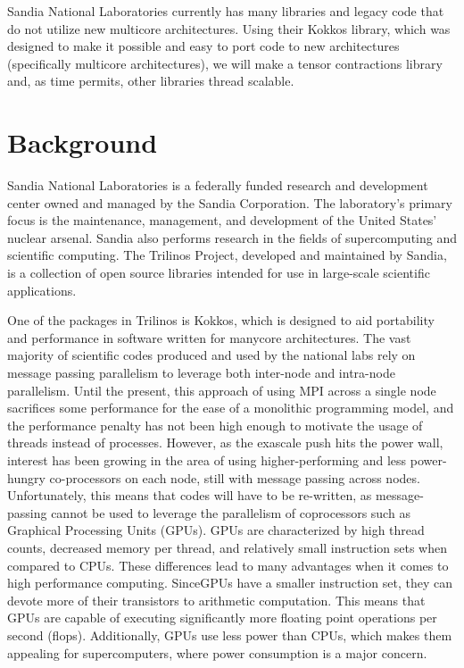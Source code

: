 \documentclass[proposal]{hmcclinic}
\begin{document}
Sandia National Laboratories currently has many libraries and legacy code that
do not utilize new multicore architectures. Using their Kokkos library, which
was designed to make it possible and easy to port code to new architectures
(specifically multicore architectures), we will make a tensor contractions
library and, as time permits, other libraries thread scalable.


\section{Background}

Sandia National Laboratories is a federally funded research and development
center owned and managed by the Sandia Corporation.  The laboratory's primary
focus is the maintenance, management, and development of the United States'
nuclear arsenal.  Sandia also performs research in the fields of supercomputing
and scientific computing.  The Trilinos Project, developed and maintained by
Sandia, is a collection of open source libraries intended for use in large-scale
scientific applications.

One of the packages in Trilinos is Kokkos, which is designed to aid portability
and performance in software written for manycore architectures.  The vast majority of 
scientific codes produced and used by the national labs rely on message passing 
parallelism to leverage both inter-node and intra-node parallelism.  Until the present, 
this approach of using MPI across a single node sacrifices some performance for the 
ease of a monolithic programming model, and the performance penalty has not been 
high enough to motivate the usage of threads instead of processes.  However, as the 
exascale push hits the power wall, interest has been growing in the area of using 
higher-performing and less power-hungry co-processors on each node, still with 
message passing across nodes.  Unfortunately, this means that codes will have to be 
re-written, as message-passing cannot be used to leverage the parallelism of 
coprocessors such as Graphical Processing Units (GPUs). GPUs are characterized by 
high thread counts, decreased memory per thread, and relatively small instruction
 sets when compared to CPUs. These differences lead to many advantages when it 
 comes to high performance computing. SinceGPUs have a smaller instruction set, 
 they can devote more of their transistors to arithmetic computation. This means that
 GPUs are capable of executing significantly more floating point
operations per second (flops). Additionally, GPUs use less power than CPUs, which makes
them appealing for supercomputers, where power consumption is a major concern.
\end{document}
